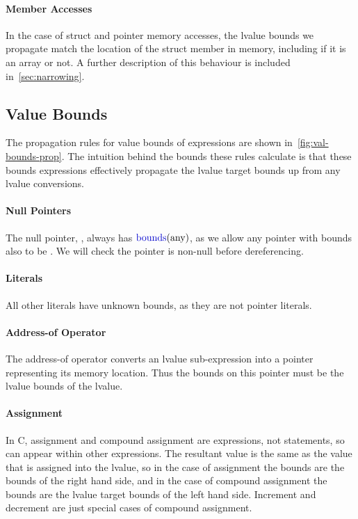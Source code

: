 \paragraph{Member Accesses} In the case of struct and pointer memory
accesses, the lvalue bounds we propagate match the location of the
struct member in memory, including if it is an array or not. A further
description of this behaviour is included in~\autoref{sec:narrowing}.

\subsection{Value Bounds}
\label{sec:value-prop-rules}

The propagation rules for value bounds of expressions are shown
in~\autoref{fig:val-bounds-prop}. The intuition behind the bounds
these rules calculate is that these bounds expressions effectively
propagate the lvalue target bounds up from any lvalue conversions.

\paragraph{Null Pointers} The null pointer, \NULL{}, always has
$\mbounds(\text{any})$, as we allow any pointer with bounds also to be
\NULL{}. We will check the pointer is non-null before dereferencing.

\paragraph{Literals} All other literals have unknown bounds, as they
are not pointer literals.

\paragraph{Address-of Operator} The address-of operator converts an
lvalue sub-expression into a pointer representing its memory location.
Thus the bounds on this pointer must be the lvalue bounds of the
lvalue.

\paragraph{Assignment} In C, assignment and compound assignment are
expressions, not statements, so can appear within other expressions.
The resultant value is the same as the value that is assigned into the
lvalue, so in the case of assignment the bounds are the bounds of the
right hand side, and in the case of compound assignment the bounds are
the lvalue target bounds of the left hand side. Increment and
decrement are just special cases of compound assignment.

